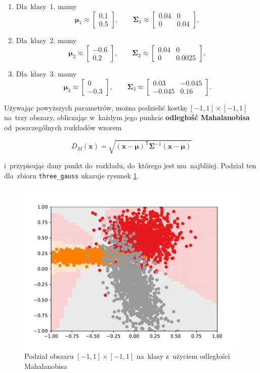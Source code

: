 \documentclass[11pt,a4paper]{article}
\begin{document}
\begin{enumerate}
    \item Dla~klasy~1. mamy
    $$
        \boldsymbol\mu_1 \approx \begin{bmatrix} 0.1 \\ 0.5 \end{bmatrix},
        \qquad
        \boldsymbol\Sigma_1 \approx \begin{bmatrix} 0.04 & 0 \\ 0 & 0.04 \end{bmatrix},
    $$
    \item Dla~klasy~2. mamy
    $$
        \boldsymbol\mu_2 \approx \begin{bmatrix} -0.6 \\ 0.2 \end{bmatrix},
        \qquad
        \boldsymbol\Sigma_2 \approx \begin{bmatrix} 0.04 & 0 \\ 0 & 0.0025 \end{bmatrix},
    $$
    \item Dla~klasy~3. mamy
    $$
        \boldsymbol\mu_3 \approx \begin{bmatrix} 0 \\ -0.3 \end{bmatrix},
        \qquad
        \boldsymbol\Sigma_3 \approx \begin{bmatrix} 0.03 & -0.045 \\ -0.045 & 0.16 \end{bmatrix}.
    $$
\end{enumerate}

Używając powyższych parametrów, można podzielić kostkę $[-1, 1] \times [-1, 1]$ na~trzy obszary, obliczając w~każdym jego punkcie \textbf{odległość Mahalanobisa} od~poszczególnych rozkładów wzorem

$$ D_M(\mathbf{x}) = \sqrt{(\mathbf{x} - \boldsymbol\mu)^\mathsf{T} \boldsymbol\Sigma^{-1} (\mathbf{x} - \boldsymbol\mu)} $$

i~przypisując dany punkt do~rozkładu, do~którego jest mu~najbliżej.
Podział ten dla~zbioru {\tt three\_gauss} ukazuje rysunek \ref{fig:gauss-ideal}.

\begin{figure}[H]
    \centering
    \includegraphics[width=.7\textwidth]{res/gauss-ideal.pdf}
    \caption{Podział obszaru $[-1,1] \times [-1,1]$ na~klasy z~użyciem odległości Mahalanobisa}
    \label{fig:gauss-ideal}
\end{figure}
\end{document}
